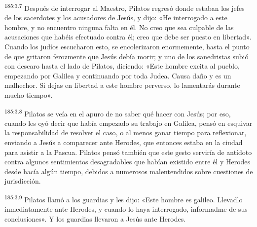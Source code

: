 \par 
\textsuperscript{185:3.7} Después de interrogar al Maestro, Pilatos regresó donde estaban los jefes de los sacerdotes y los acusadores de Jesús, y dijo: «He interrogado a este hombre, y no encuentro ninguna falta en él. No creo que sea culpable de las acusaciones que habéis efectuado contra él; creo que debe ser puesto en libertad». Cuando los judíos escucharon esto, se encolerizaron enormemente, hasta el punto de que gritaron ferozmente que Jesús debía morir; y uno de los sanedristas subió con descaro hasta el lado de Pilatos, diciendo: «Este hombre excita al pueblo, empezando por Galilea y continuando por toda Judea. Causa daño y es un malhechor. Si dejas en libertad a este hombre perverso, lo lamentarás durante mucho tiempo».

\par 
\textsuperscript{185:3.8} Pilatos se veía en el apuro de no saber qué hacer con Jesús; por eso, cuando les oyó decir que había empezado su trabajo en Galilea, pensó en esquivar la responsabilidad de resolver el caso, o al menos ganar tiempo para reflexionar, enviando a Jesús a comparecer ante Herodes, que entonces estaba en la ciudad para asistir a la Pascua. Pilatos pensó también que este gesto serviría de antídoto contra algunos sentimientos desagradables que habían existido entre él y Herodes desde hacía algún tiempo, debidos a numerosos malentendidos sobre cuestiones de jurisdicción.

\par 
\textsuperscript{185:3.9} Pilatos llamó a los guardias y les dijo: «Este hombre es galileo. Llevadlo inmediatamente ante Herodes, y cuando lo haya interrogado, informadme de sus conclusiones». Y los guardias llevaron a Jesús ante Herodes.


